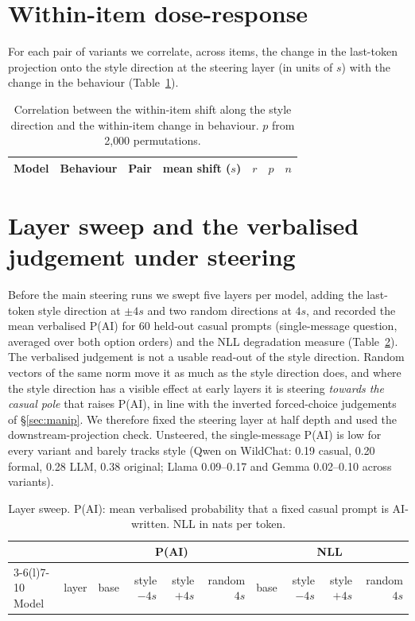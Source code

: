 \clearpage
\section{Within-item dose-response}
\label{app:dose}
For each pair of variants we correlate, across items, the change in the last-token projection onto the style direction at the steering layer (in units of $s$) with the change in the behaviour (Table~\ref{tab:dose}).

\begin{table}[H]
\centering\footnotesize
\caption{Correlation between the within-item shift along the style direction and the within-item change in behaviour. $p$ from 2{,}000 permutations.}
\label{tab:dose}
\begin{tabular}{lllrrrr}
\toprule
Model & Behaviour & Pair & mean shift ($s$) & $r$ & $p$ & $n$ \\
\midrule

\end{tabular}
\end{table}

\section{Layer sweep and the verbalised judgement under steering}
\label{app:sweep}
Before the main steering runs we swept five layers per model, adding the last-token style direction at $\pm4s$ and two random directions at $4s$, and recorded the mean verbalised P(AI) for 60 held-out casual prompts (single-message question, averaged over both option orders) and the NLL degradation measure (Table~\ref{tab:sweep}). The verbalised judgement is not a usable read-out of the style direction. Random vectors of the same norm move it as much as the style direction does, and where the style direction has a visible effect at early layers it is steering \emph{towards the casual pole} that raises P(AI), in line with the inverted forced-choice judgements of \S\ref{sec:manip}. We therefore fixed the steering layer at half depth and used the downstream-projection check. Unsteered, the single-message P(AI) is low for every variant and barely tracks style (Qwen on WildChat: 0.19 casual, 0.20 formal, 0.28 LLM, 0.38 original; Llama 0.09--0.17 and Gemma 0.02--0.10 across variants).

\begin{table}[H]
\centering\footnotesize
\caption{Layer sweep. P(AI): mean verbalised probability that a fixed casual prompt is AI-written. NLL in nats per token.}
\label{tab:sweep}
\begin{tabular}{lrrrrrrrrr}
\toprule
& & \multicolumn{4}{c}{P(AI)} & \multicolumn{4}{c}{NLL} \\ \cmidrule(lr){3-6}\cmidrule(l){7-10}
Model & layer & base & style $-4s$ & style $+4s$ & random $4s$ & base & style $-4s$ & style $+4s$ & random $4s$ \\
\midrule

\end{tabular}
\end{table}

